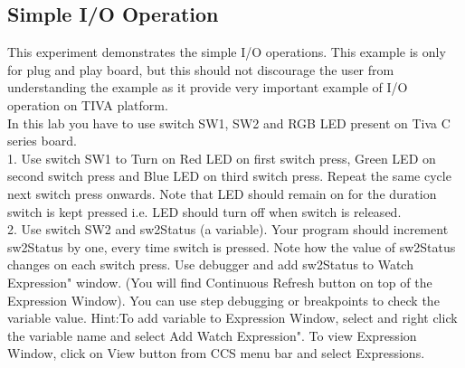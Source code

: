 \documentclass[a4paper,10pt,oneside]{article}
\begin{document}
		\subsection{\huge \textbf{Simple I/O Operation}}		
			{This experiment demonstrates the simple I/O operations.
			This example is only for plug and play board, but this should not discourage
			the user from understanding the example as it provide very important example of I/O operation 
			on TIVA platform.\\
			In this lab you have to use switch SW1, SW2 and RGB LED present on Tiva C series board.\\
			1. Use switch SW1 to Turn on Red LED on first switch press, Green LED on second
			switch press and Blue LED on third switch press. Repeat the same cycle next switch
			press onwards. Note that LED should remain on for the duration switch is kept pressed
			i.e. LED should turn off when switch is released.\\
			2. Use switch SW2 and sw2Status (a variable). Your program should increment sw2Status
			by one, every time switch is pressed. Note how the value of sw2Status changes on each
			switch press. Use debugger and add sw2Status to  Watch Expression" 	window.
			(You will find Continuous Refresh button on top of the Expression 	Window). You can
			use step debugging or breakpoints to check the variable value.
			Hint:To add variable to Expression Window, select and right click the variable name
			and select  Add Watch Expression". To view Expression Window, click on View button from CCS menu bar and select Expressions.}
			
\end{document}

